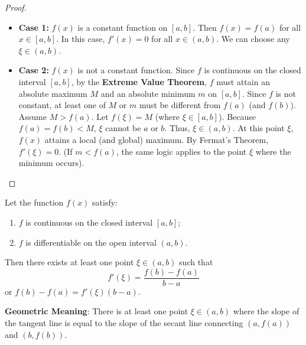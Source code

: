 \documentclass[oneside]{book}
\begin{document}
\begin{proof}
\begin{itemize}
    \item \textbf{Case 1:} $f(x)$ is a constant function on $[a, b]$.
    Then $f(x) = f(a)$ for all $x \in [a, b]$.
    In this case, $f'(x) = 0$ for all $x \in (a, b)$. We can choose any $\xi \in (a, b)$.
    
    \item \textbf{Case 2:} $f(x)$ is not a constant function.
    Since $f$ is continuous on the closed interval $[a, b]$, by the \textbf{Extreme Value Theorem}, $f$ must attain an absolute maximum $M$ and an absolute minimum $m$ on $[a, b]$.
    Since $f$ is not constant, at least one of $M$ or $m$ must be different from $f(a)$ (and $f(b)$).
    Assume $M > f(a)$. Let $f(\xi) = M$ (where $\xi \in [a, b]$).
    Because $f(a) = f(b) < M$, $\xi$ cannot be $a$ or $b$.
    Thus, $\xi \in (a, b)$.
    At this point $\xi$, $f(x)$ attains a local (and global) maximum.
    By Fermat's Theorem, $f'(\xi) = 0$.
    (If $m < f(a)$, the same logic applies to the point $\xi$ where the minimum occurs).
\end{itemize}
\end{proof}

\begin{theorem}
\label{thm:lagrange_en}
Let the function $f(x)$ satisfy:
\begin{enumerate}
    \item $f$ is continuous on the closed interval $[a, b]$;
    \item $f$ is differentiable on the open interval $(a, b)$.
\end{enumerate}
Then there exists at least one point $\xi \in (a, b)$ such that
\[
f'(\xi) = \frac{f(b) - f(a)}{b - a}
\]
or $f(b) - f(a) = f'(\xi)(b - a)$.
\end{theorem}

\textbf{Geometric Meaning}: There is at least one point $\xi \in (a, b)$ where the slope of the tangent line is equal to the slope of the secant line connecting $(a, f(a))$ and $(b, f(b))$.
\end{document}
